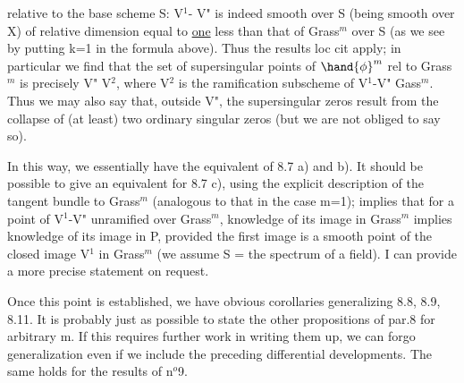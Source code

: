 
relative to the base scheme S: V$^1$- V" is indeed smooth over S
(being smooth over X) of relative dimension equal to \uline{one} less than that of
Grass$^m$ over S (as we see by putting k=1 in the formula above).
Thus the results  loc cit apply; in particular we find
that the set of supersingular points of $\hand{\phi}^m$ rel to Grass$^m$
is precisely V" \hand{$\cup$} V$^2$, where V$^2$ is the ramification subscheme
of V$^1$-V" \hand{$\longrightarrow$} Gass$^m$. Thus we may also say that, outside V",
the supersingular zeros result from the collapse of (at least) two ordinary
singular zeros (but we are not obliged to say so\hand{)}).

 In this way, we essentially have the equivalent of 8.7 a) and b). It 
should be possible to give an equivalent for 8.7 c),  using
the explicit  description of the tangent bundle to Grass$^m$ (analogous to
that in the case m=1);    implies that for a  point of V$^1$-V" unramified
over Grass$^m$, knowledge of its image in Grass$^m$
implies knowledge of its image in P, provided the first image is a
smooth point of the closed image  V$^1$ in Grass$^m$ (we assume S = the spectrum of
a field). I can provide a  more precise statement on request.

Once this point is established, we have obvious corollaries generalizing
8.8, 8.9, 8.11. It is probably just as possible to state
the other propositions of par.8 for arbitrary m. If this requires further
work in writing them up, we can forgo  generalization\hand{,}
 even if we include the preceding differential developments.
The same holds for the results of n$^o$9.

